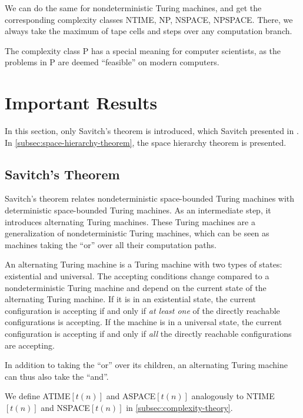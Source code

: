 We can do the same for nondeterministic Turing machines, and get the corresponding complexity classes NTIME, NP, NSPACE, NPSPACE\@.
There, we always take the maximum of tape cells and steps over any computation branch.

The complexity class P has a special meaning for computer scientists, as the problems in P are deemed ``feasible'' on modern computers.


\section{Important Results}\label{sec:important-results}

In this section, only Savitch's theorem is introduced, which Savitch presented in \cite{Savitch1970}.
In \cref{subsec:space-hierarchy-theorem}, the space hierarchy theorem is presented.

\subsection{Savitch's Theorem}\label{subsec:nspacesubsetdspacesquared}

Savitch's theorem relates nondeterministic space-bounded Turing machines with deterministic space-bounded Turing machines.
As an intermediate step, it introduces alternating Turing machines.
These Turing machines are a generalization of nondeterministic Turing machines, which can be seen as machines taking the ``or'' over all their computation paths.

\begin{define}
    An alternating Turing machine is a Turing machine with two types of states: existential and universal.
    The accepting conditions change compared to a nondeterministic Turing machine and depend on the current state of the alternating Turing machine.
    If it is in an existential state, the current configuration is accepting if and only if \emph{at least one} of the directly reachable configurations is accepting.
    If the machine is in a universal state, the current configuration is accepting if and only if \emph{all} the directly reachable configurations are accepting.
\end{define}

In addition to taking the ``or'' over its children, an alternating Turing machine can thus also take the ``and''.

\sloppy We define ATIME$[t(n)]$ and ASPACE$[t(n)]$ analogously to NTIME$[t(n)]$ and NSPACE$[t(n)]$ in \cref{subsec:complexity-theory}.

